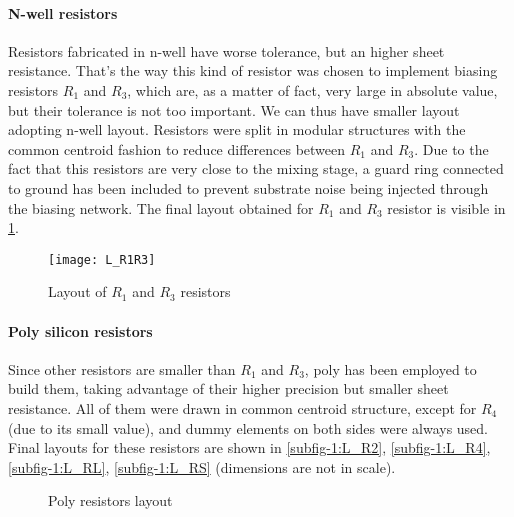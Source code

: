 \paragraph{N-well resistors}
Resistors fabricated in n-well have worse tolerance, but an higher sheet resistance. That's the way this kind of resistor was chosen to implement biasing resistors \(R_1\) and \(R_3\), which are, as a matter of fact, very large in absolute value, but their tolerance is not too important. We can thus have smaller layout adopting n-well layout. Resistors were split in modular structures with the common centroid fashion to reduce differences between \(R_1\) and \(R_3\). Due to the fact that this resistors are very close to the mixing stage, a guard ring connected to ground has been included to prevent substrate noise being injected through the biasing network. The final layout obtained for \(R_1\) and \(R_3\) resistor is visible in \ref{L_R1R3}.
 
\begin{figure}[H]
	\centering
	\texttt{[image: L\_R1R3]}
	\caption{Layout of $R_1$ and $R_3$ resistors}
	\label{L_R1R3}
\end{figure}

\paragraph{Poly silicon resistors}
Since other resistors are smaller than \(R_1\) and \(R_3\), poly has been employed to build them, taking advantage of their higher precision but smaller sheet resistance. All of them were drawn in common centroid structure, except for \(R_4\) (due to its small value), and dummy elements on both sides were always used. Final layouts for these resistors are shown in \ref{subfig-1:L_R2}, \ref{subfig-1:L_R4}, \ref{subfig-1:L_RL}, \ref{subfig-1:L_RS} (dimensions are not in scale). 

\begin{figure}[H]
	\centering
	
	\vfill
	\hfil
	\caption{Poly resistors layout}
\end{figure}

